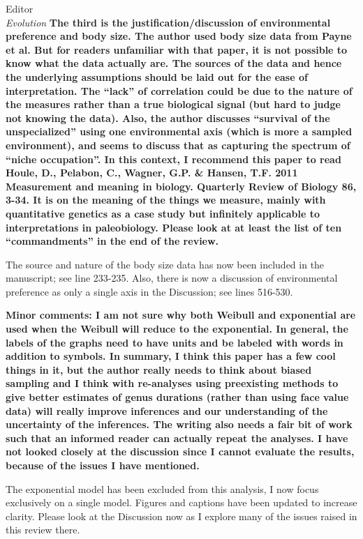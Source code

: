 \documentclass{letter}
\begin{document}
\begin{letter}{Editor \\ \textit{Evolution}}
  \textbf{The third is the justification/discussion of environmental preference and body size. The author used body size data from Payne et al. But for readers unfamiliar with that paper, it is not possible to know what the data actually are. The sources of the data and hence the underlying assumptions should be laid out for the ease of interpretation. The “lack” of correlation could be due to the nature of the measures rather than a true biological signal (but hard to judge not knowing the data). Also, the author discusses “survival of the unspecialized” using one environmental axis (which is more a sampled environment), and seems to discuss that as capturing the spectrum of “niche occupation”. In this context, I recommend this paper to read Houle, D., Pelabon, C., Wagner, G.P. \& Hansen, T.F. 2011 Measurement and meaning in biology. Quarterly Review of Biology 86, 3-34. It is on the meaning of the things we measure, mainly with quantitative genetics as a case study but infinitely applicable to interpretations in paleobiology. Please look at at least the list of ten “commandments” in the end of the review. }

  The source and nature of the body size data has now been included in the manuscript; see line 233-235. Also, there is now a discussion of environmental preference as only a single axis in the Discussion; see lines 516-530. %

  
  \textbf{Minor comments: I am not sure why both Weibull and exponential are used when the Weibull will reduce to the exponential. In general, the labels of the graphs need to have units and be labeled with words in addition to symbols. In summary, I think this paper has a few cool things in it, but the author really needs to think about biased sampling and I think with re-analyses using preexisting methods to give better estimates of genus durations (rather than using face value data) will really improve inferences and our understanding of the uncertainty of the inferences. The writing also needs a fair bit of work such that an informed reader can actually repeat the analyses. I have not looked closely at the discussion since I cannot evaluate the results, because of the issues I have mentioned. }
  
  The exponential model has been excluded from this analysis, I now focus exclusively on a single model. Figures and captions have been updated to increase clarity. Please look at the Discussion now as I explore many of the issues raised in this review there.



\end{letter}


\end{document}
